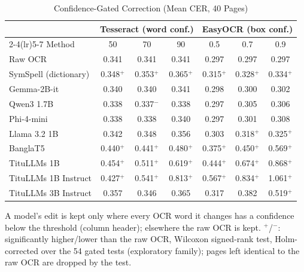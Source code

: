 \begin{table}[t]
\centering
\caption{Confidence-Gated Correction (Mean CER, 40 Pages)}
\label{tab:gated}
\setlength{\tabcolsep}{2pt}
\footnotesize
\begin{tabular}{lcccccc}
\toprule
 & \multicolumn{3}{c}{Tesseract (word conf.)} & \multicolumn{3}{c}{EasyOCR (box conf.)} \\
\cmidrule(lr){2-4}\cmidrule(lr){5-7}
Method & 50 & 70 & 90 & 0.5 & 0.7 & 0.9 \\
\midrule
Raw OCR & 0.341 & 0.341 & 0.341 & 0.297 & 0.297 & 0.297 \\
\midrule
SymSpell (dictionary) & 0.348$^{+}$ & 0.353$^{+}$ & 0.365$^{+}$ & 0.315$^{+}$ & 0.328$^{+}$ & 0.334$^{+}$ \\
Gemma-2B-it & 0.340 & 0.340 & 0.341 & 0.298 & 0.300 & 0.302 \\
Qwen3 1.7B & 0.338 & 0.337$^{-}$ & 0.338 & 0.297 & 0.305 & 0.306 \\
Phi-4-mini & 0.338 & 0.338 & 0.340 & 0.297 & 0.301 & 0.308 \\
Llama 3.2 1B & 0.342 & 0.348 & 0.356 & 0.303 & 0.318$^{+}$ & 0.325$^{+}$ \\
BanglaT5 & 0.440$^{+}$ & 0.441$^{+}$ & 0.480$^{+}$ & 0.375$^{+}$ & 0.450$^{+}$ & 0.569$^{+}$ \\
TituLLMs 1B & 0.454$^{+}$ & 0.511$^{+}$ & 0.619$^{+}$ & 0.444$^{+}$ & 0.674$^{+}$ & 0.868$^{+}$ \\
TituLLMs 1B Instruct & 0.427$^{+}$ & 0.541$^{+}$ & 0.813$^{+}$ & 0.567$^{+}$ & 0.834$^{+}$ & 1.061$^{+}$ \\
TituLLMs 3B Instruct & 0.357 & 0.346 & 0.365 & 0.317 & 0.382 & 0.519$^{+}$ \\
\bottomrule
\end{tabular}
\par\smallskip
\begin{minipage}{\linewidth}\footnotesize A model's edit is kept only where every OCR word it changes has a confidence below the threshold (column header); elsewhere the raw OCR is kept. $^{+}$/$^{-}$: significantly higher/lower than the raw OCR, Wilcoxon signed-rank test, Holm-corrected over the 54 gated tests (exploratory family); pages left identical to the raw OCR are dropped by the test.\end{minipage}
\end{table}
